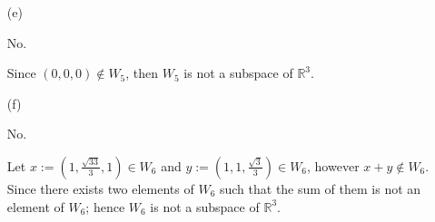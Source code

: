 \begin{Exercise}
\begin{enumerate}[(a)]
		\item[(e)]
		\begin{answer}
			No.
		\end{answer}
		\begin{solution}
			Since $(0,0,0)\notin W_5$, then $W_5$ is not a subspace of $\mathbb{R}^3$.
		\end{solution}
		
		\item[(f)]
		\begin{answer}
			No.
		\end{answer}
		\begin{solution}
			Let $x := (1,\frac{\sqrt{33}}{3},1)\in W_6$ and $y := (1,1,\frac{\sqrt{3}}{3})\in W_6$, however $x+y\notin W_6$.
			Since there exists two elements of $W_6$ such that the sum of them is not an element of $W_6$; hence $W_6$ is not a subspace of $\mathbb{R}^3$.
		\end{solution}
		
	\end{enumerate}
\end{Exercise}